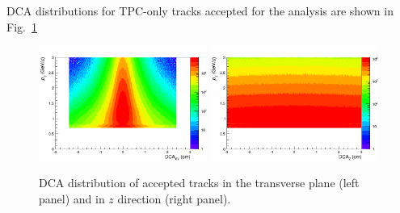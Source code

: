 DCA distributions for TPC-only tracks accepted for the analysis are shown in Fig.~\ref{dca}
\begin{figure}%
  \centering
  \includegraphics[width=0.49\textwidth]{dcaxy}
  \includegraphics[width=0.49\textwidth]{dcaz}
  \caption{DCA distribution of accepted tracks in the transverse plane (left panel) and in $z$ direction (right panel).}
  \label{dca}
\end{figure}



